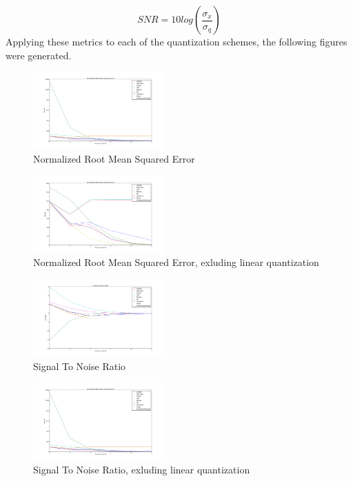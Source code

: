 \documentclass[journal]{IEEEtran}
\begin{document}
\begin{equation}
    SNR = 10log(\frac{\sigma_x}{\sigma_q})
    \label{eq:SNR}
\end{equation}
Applying these metrics to each of the quantization schemes, the following figures were generated. 
\begin{figure}[h!]
\centering
  \includegraphics[width=0.45\textwidth]{NRMSE_all.png}
\caption{Normalized Root Mean Squared Error}
\label{fig:NRMSE_all}
\end{figure}
\begin{figure}[h!]
\centering
  \includegraphics[width=0.45\textwidth]{NRMSE_nolinear.png}
\caption{Normalized Root Mean Squared Error, exluding linear quantization}
\label{fig:NRMSE_nolinear}
\end{figure}
\begin{figure}[h!]
\centering
  \includegraphics[width=0.45\textwidth]{SNR_all.png}
\caption{Signal To Noise Ratio}
\label{fig:SNR_all}
\end{figure}
\begin{figure}[h!]
\centering
  \includegraphics[width=0.45\textwidth]{NRMSE_all.png}
\caption{Signal To Noise Ratio, exluding linear quantization}
\label{fig:SNR_nolinear}
\end{figure}
\end{document}
